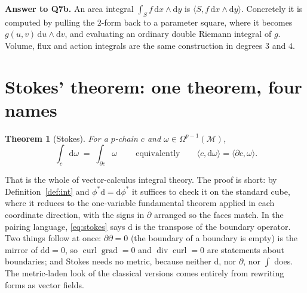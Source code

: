 \documentclass[10pt,a4paper]{article}
\newcommand{\dd}{\mathrm{d}}
\newcommand{\M}{\mathcal{M}}
\newcommand{\Om}{\Omega}
\DeclareMathOperator{\grad}{grad}
\DeclareMathOperator{\curl}{curl}
\DeclareMathOperator{\dive}{div}
\newcommand{\pair}[2]{\langle #1 , #2 \rangle}
\theoremstyle{plain}
\newtheorem{thm}{Theorem}[section]
\theoremstyle{definition}
\numberwithin{equation}{section}
\begin{document}
\begin{keybox}
\textbf{Answer to Q7b.} An area integral $\int_Sf\,\dd x\wedge\dd y$ is
$\pair{S}{f\,\dd x\wedge\dd y}$. Concretely it is computed by pulling the $2$-form back to a
parameter square, where it becomes $g(u,v)\,\dd u\wedge\dd v$, and evaluating an ordinary double
Riemann integral of $g$. Volume, flux and action integrals are the same construction in degrees
$3$ and $4$.
\end{keybox}

\section{Stokes' theorem: one theorem, four names}
\label{sec:stokes}

\begin{thm}[Stokes]\label{thm:stokes}
For a $p$-chain $c$ and $\omega\in\Om^{p-1}(\M)$,
\begin{equation}
\boxed{\ \int_c\dd\omega\;=\;\int_{\partial c}\omega\ }
\qquad\text{equivalently}\qquad \pair{c}{\dd\omega}=\pair{\partial c}{\omega}.
\label{eq:stokes}
\end{equation}
\end{thm}

\noindent That is the whole of vector-calculus integral theory. The proof is short: by
Definition~\ref{def:int} and $\phi^*\dd=\dd\phi^*$ it suffices to check it on the standard cube,
where it reduces to the one-variable fundamental theorem applied in each coordinate direction,
with the signs in $\partial$ arranged so the faces match. In the pairing language,
\eqref{eq:stokes} says $\dd$ is the transpose of the boundary operator. Two things follow at
once: $\partial\partial=0$ (the boundary of a boundary is empty) is the mirror of $\dd\dd=0$, so
$\curl\grad=0$ and $\dive\curl=0$ are statements about boundaries; and Stokes needs no metric,
because neither $\dd$, nor $\partial$, nor $\int$ does. The metric-laden look of the classical
versions comes entirely from rewriting forms as vector fields.
\end{document}
